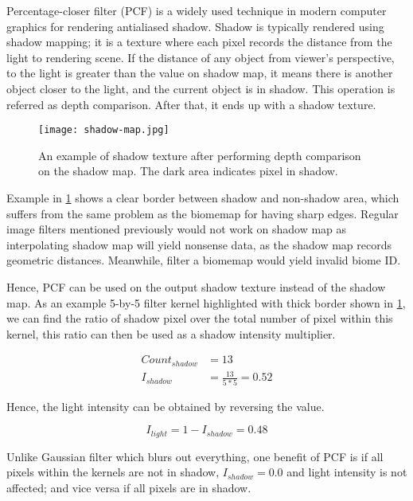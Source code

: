 \documentclass[oneside, a4paper]{report}
\begin{document}
    Percentage-closer filter \cite{pcf} (PCF) is a widely used technique in modern computer graphics for rendering antialiased shadow. Shadow is typically rendered using shadow mapping; it is a texture where each pixel records the distance from the light to rendering scene. If the distance of any object from viewer's perspective, to the light is greater than the value on shadow map, it means there is another object closer to the light, and the current object is in shadow. This operation is referred as depth comparison. After that, it ends up with a shadow texture.

    \begin{figure}[H]
        \center
        \texttt{[image: shadow-map.jpg]}
        \caption{An example of shadow texture after performing depth comparison on the shadow map. The dark area indicates pixel in shadow.}
        \label{shadow_texture}
    \end{figure}

    Example in \ref{shadow_texture} shows a clear border between shadow and non-shadow area, which suffers from the same problem as the biomemap for having sharp edges. Regular image filters mentioned previously would not work on shadow map as interpolating shadow map will yield nonsense data, as the shadow map records geometric distances. Meanwhile, filter a biomemap would yield invalid biome ID.

    Hence, PCF can be used on the output shadow texture instead of the shadow map. As an example 5-by-5 filter kernel highlighted with thick border shown in \ref{shadow_texture}, we can find the ratio of shadow pixel over the total number of pixel within this kernel, this ratio can then be used as a shadow intensity multiplier.

    \begin{align*}
        Count_{shadow} &= 13 \\
        I_{shadow} &= \frac{13}{5 * 5} = 0.52
    \end{align*}

    Hence, the light intensity can be obtained by reversing the value.

    \begin{equation*}
        I_{light} = 1 - I_{shadow} = 0.48
    \end{equation*}

    Unlike Gaussian filter which blurs out everything, one benefit of PCF is if all pixels within the kernels are not in shadow, \(I_{shadow} = 0.0\) and light intensity is not affected; and vice versa if all pixels are in shadow.
\end{document}
